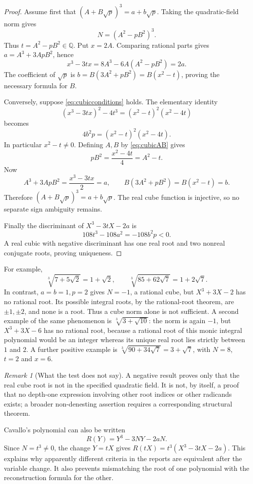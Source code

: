 \documentclass[11pt,oneside]{article}
\numberwithin{equation}{section}
\theoremstyle{definition}
\theoremstyle{remark}
\newtheorem{remark}[theorem]{Remark}
\newcommand{\Q}{\mathbb{Q}}
\begin{document}
\begin{proof}
Assume first that $(A+B\sqrt p)^3=a+b\sqrt p$. Taking the quadratic-field norm gives
\[
N=(A^2-pB^2)^3.
\]
Thus $t=A^2-pB^2\in\Q$. Put $x=2A$. Comparing rational parts gives $a=A^3+3ApB^2$, hence
\[
x^3-3tx=8A^3-6A(A^2-pB^2)=2a.
\]
The coefficient of $\sqrt p$ is $b=B(3A^2+pB^2)=B(x^2-t)$, proving the necessary formula for $B$.

Conversely, suppose \eqref{eq:cubicconditions} holds. The elementary identity
\begin{equation}\label{eq:tracecertificate}
(x^3-3tx)^2-4t^3=(x^2-t)^2(x^2-4t)
\end{equation}
becomes
\[
4b^2p=(x^2-t)^2(x^2-4t).
\]
In particular $x^2-t\ne0$. Defining $A,B$ by \eqref{eq:cubicAB} gives
\[
pB^2=\frac{x^2-4t}{4}=A^2-t.
\]
Now
\[
A^3+3ApB^2=\frac{x^3-3tx}{2}=a,
\qquad B(3A^2+pB^2)=B(x^2-t)=b.
\]
Therefore $(A+B\sqrt p)^3=a+b\sqrt p$. The real cube function is injective, so no separate sign ambiguity remains.

Finally the discriminant of $X^3-3tX-2a$ is
\[
108t^3-108a^2=-108b^2p<0.
\]
A real cubic with negative discriminant has one real root and two nonreal conjugate roots, proving uniqueness.
\end{proof}

For example,
\[
\sqrt[3]{7+5\sqrt2}=1+\sqrt2,
\qquad
\sqrt[3]{85+62\sqrt7}=1+2\sqrt7.
\]
In contrast, $a=b=1,p=2$ gives $N=-1$, a rational cube, but $X^3+3X-2$ has no rational root. Its possible integral roots, by the rational-root theorem, are $\pm1,\pm2$, and none is a root. Thus a cube norm alone is not sufficient. A second example of the same phenomenon is $\sqrt[3]{3+\sqrt{10}}$: the norm is again $-1$, but $X^3+3X-6$ has no rational root, because a rational root of this monic integral polynomial would be an integer whereas its unique real root lies strictly between $1$ and $2$. A further positive example is $\sqrt[3]{90+34\sqrt7}=3+\sqrt7$, with $N=8$, $t=2$ and $x=6$.

\begin{remark}[What the test does not say]
A negative result proves only that the real cube root is not in the specified quadratic field. It is not, by itself, a proof that no depth-one expression involving other root indices or other radicands exists; a broader non-denesting assertion requires a corresponding structural theorem.
\end{remark}

Cavallo's polynomial can also be written
\[
R(Y)=Y^3-3NY-2aN.
\]
Since $N=t^3\ne0$, the change $Y=tX$ gives $R(tX)=t^3(X^3-3tX-2a)$. This explains why apparently different criteria in the reports are equivalent after the variable change. It also prevents mismatching the root of one polynomial with the reconstruction formula for the other.
\end{document}
